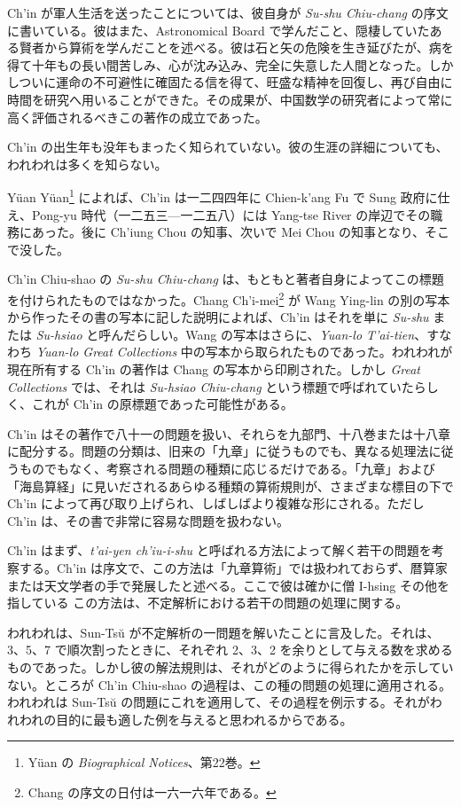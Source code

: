 \documentclass[11pt]{article}
\newcommand{\scanpage}[2]{\clearpage\setcounter{footnote}{0}\noindent{\footnotesize\color{gray}PDF #1 頁 · #2}\par\medskip}
\newcommand{\scanfooter}{}
\begin{document}
Ch'in が軍人生活を送ったことについては、彼自身が \emph{Su-shu Chiu-chang} の序文に書いている。彼はまた、Astronomical Board で学んだこと、隠棲していたある賢者から算術を学んだことを述べる。彼は石と矢の危険を生き延びたが、病を得て十年もの長い間苦しみ、心が沈み込み、完全に失意した人間となった。しかしついに運命の不可避性に確固たる信を得て、旺盛な精神を回復し、再び自由に時間を研究へ用いることができた。その成果が、中国数学の研究者によって常に高く評価されるべきこの著作の成立であった。

Ch'in の出生年も没年もまったく知られていない。彼の生涯の詳細についても、われわれは多くを知らない。

Yüan Yüan\footnote{Yüan の \emph{Biographical Notices}、第22巻。} によれば、Ch'in は一二四四年に Chien-k'ang Fu で Sung 政府に仕え、Pong-yu 時代（一二五三---一二五八）には Yang-tse River の岸辺でその職務にあった。後に Ch'iung Chou の知事、次いで Mei Chou の知事となり、そこで没した。

Ch'in Chiu-shao の \emph{Su-shu Chiu-chang} は、もともと著者自身によってこの標題を付けられたものではなかった。Chang Ch'i-mei\footnote{Chang の序文の日付は一六一六年である。} が Wang Ying-lin の別の写本から作ったその書の写本に記した説明によれば、Ch'in はそれを単に \emph{Su-shu} または \emph{Su-hsiao} と呼んだらしい。Wang の写本はさらに、\emph{Yuan-lo T'ai-tien}、すなわち \emph{Yuan-lo Great Collections} 中の写本から取られたものであった。われわれが現在所有する Ch'in の著作は Chang の写本から印刷された。しかし \emph{Great Collections} では、それは \emph{Su-hsiao Chiu-chang} という標題で呼ばれていたらしく、これが Ch'in の原標題であった可能性がある。
\scanfooter

\scanpage{0079}{第11章、印刷頁65}
Ch'in はその著作で八十一の問題を扱い、それらを九部門、十八巻または十八章に配分する。問題の分類は、旧来の「九章」に従うものでも、異なる処理法に従うものでもなく、考察される問題の種類に応じるだけである。「九章」および「海島算経」に見いだされるあらゆる種類の算術規則が、さまざまな標目の下で Ch'in によって再び取り上げられ、しばしばより複雑な形にされる。ただし Ch'in は、その書で非常に容易な問題を扱わない。

Ch'in はまず、\emph{t'ai-yen ch'iu-i-shu} と呼ばれる方法によって解く若干の問題を考察する。Ch'in は序文で、この方法は「九章算術」では扱われておらず、暦算家または天文学者の手で発展したと述べる。ここで彼は確かに僧 I-hsing その他を指している この方法は、不定解析における若干の問題の処理に関する。

われわれは、Sun-Tsŭ が不定解析の一問題を解いたことに言及した。それは、3、5、7 で順次割ったときに、それぞれ 2、3、2 を余りとして与える数を求めるものであった。しかし彼の解法規則は、それがどのように得られたかを示していない。ところが Ch'in Chiu-shao の過程は、この種の問題の処理に適用される。われわれは Sun-Tsŭ の問題にこれを適用して、その過程を例示する。それがわれわれの目的に最も適した例を与えると思われるからである。
\end{document}
